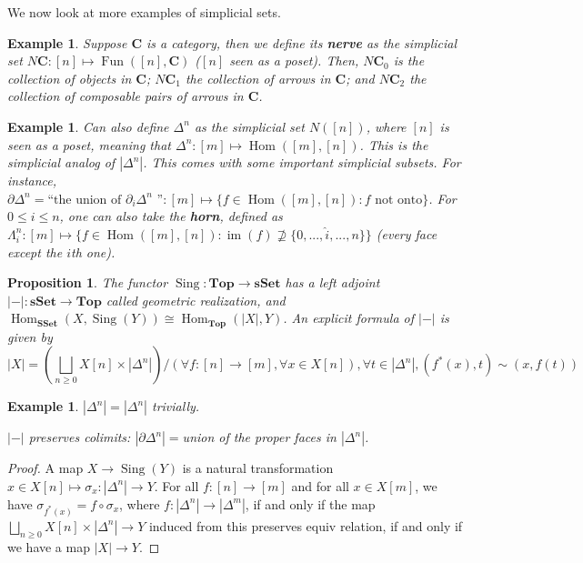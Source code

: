 \documentclass{article}
\theoremstyle{definition}
\theoremstyle{remark}
\theoremstyle{plain}
\newtheorem{prop}[defn]{Proposition}
\newtheorem{example}[defn]{Example}
\begin{document}
We now look at more examples of simplicial sets.
\begin{example}
    Suppose $\mathbf{C}$ is a category, then we define its \textbf{nerve} as the simplicial set $N\mathbf{C}:[n]\mapsto \operatorname{Fun}([n],\mathbf{C})$ ($[n]$ seen as a poset). Then, $N\mathbf{C}_0$ is the collection of objects in $\mathbf{C}$; $N\mathbf{C}_1$ the collection of arrows in $\mathbf{C}$; and $N\mathbf{C}_2$ the collection of composable pairs of arrows in $\mathbf{C}$.
\end{example}
\begin{example}
    Can also define $\Delta^n$ as the simplicial set $N([n])$, where $[n]$ is seen as a poset, meaning that $\Delta^n:[m]\mapsto\operatorname{Hom}([m],[n])$. This is the simplicial analog of $|\Delta^n|$. This comes with some important simplicial subsets. For instance, $\partial\Delta^n=\text{``the union of }\partial_i\Delta^n\text{ ''}:[m]\mapsto\{f\in\operatorname{Hom}([m],[n]):f\text{ not onto}\}$. For $0\le i\le n$, one can also take the \textbf{horn}, defined as $\Lambda_i^n:[m]\mapsto\{f\in\operatorname{Hom}([m],[n]):\operatorname{im}(f)\not\supseteq\{0,...,\hat{i},...,n\}\}$ (every face except the $i$th one).
\end{example}
\begin{prop}
    The functor $\operatorname{Sing}:\mathbf{Top}\to\mathbf{sSet}$ has a left adjoint $|-|:\mathbf{sSet}\to\mathbf{Top}$ called geometric realization, and $\operatorname{Hom}_{\mathbf{SSet}}(X,\operatorname{Sing}(Y))\cong\operatorname{Hom}_{\mathbf{Top}}(|X|,Y)$. An explicit formula of $|-|$ is given by
    \[|X|=\left(\bigsqcup_{n\ge 0}X[n]\times|\Delta^n|\right)\Bigg/(\forall f:[n]\to[m],\forall x\in X[n]),\forall t\in|\Delta^n|,(f^\ast(x),t)\sim(x,f(t))\]    
\end{prop}
\begin{example}
    $|\Delta^n|=|\Delta^n|$ trivially.

    $|-|$ preserves colimits: $|\partial \Delta^n|=$union of the proper faces in $|\Delta^n|$.
\end{example}
\begin{proof}
    A map $X\to\operatorname{Sing}(Y)$ is a natural transformation $x\in X[n]\mapsto \sigma_x:|\Delta^n|\to Y$. For all $f:[n]\to[m]$ and for all $x\in X[m]$, we have $\sigma_{f^\ast(x)}=f\circ\sigma_x$, where $f:|\Delta^n|\to|\Delta^m|$, if and only if the map $\bigsqcup_{n\ge0}X[n]\times|\Delta^n|\to Y$ induced from this preserves equiv relation, if and only if we have a map $|X|\to Y$.
\end{proof}
\end{document}
